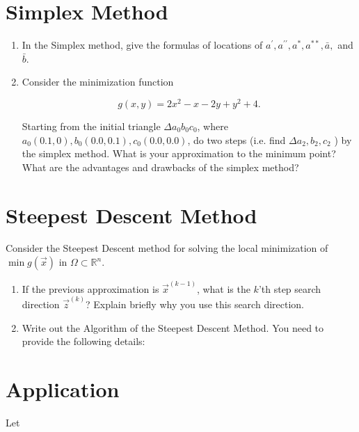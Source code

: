 \documentclass[11pt,oneside]{extarticle}
\newcommand{\Real}{\mathbb{R}}
\newcommand{\dprime}{{\prime\prime}}
\begin{document}
\section{Simplex Method}

    \begin{enumerate}

        \item In the Simplex method, give the formulas of locations of
            $a^\prime, a^\dprime, a^*, a^{**}, \bar{a},$ and $\bar{b}$.

        \item Consider the minimization function

            $$g(x,y) = 2x^2 - x - 2y + y^2 + 4.$$

            Starting from the initial triangle $\Delta a_0b_0c_0$, where
            $a_0(0.1,0), b_0(0.0,0.1), c_0(0.0,0.0)$, do two steps (i.e. find
            $\Delta a_2,b_2,c_2$ ) by the simplex method. What is your approximation
            to the minimum point? What are the advantages and drawbacks of the
            simplex method?

    \end{enumerate}

\section{Steepest Descent Method}

Consider the Steepest Descent method for solving the local minimization of
$\min g(\vec{x})$ in $\Omega\subset\Real^n$.

    \begin{enumerate}

        \item If the previous approximation is $\vec{x}^{(k-1)}$, what is the
            $k$'th step search direction $\vec{z}^{(k)}$? Explain briefly why
            you use this search direction.

        \item Write out the Algorithm of the Steepest Descent Method. You need
            to provide the following details:

    \end{enumerate}

\section{Application}

Let
\end{document}
